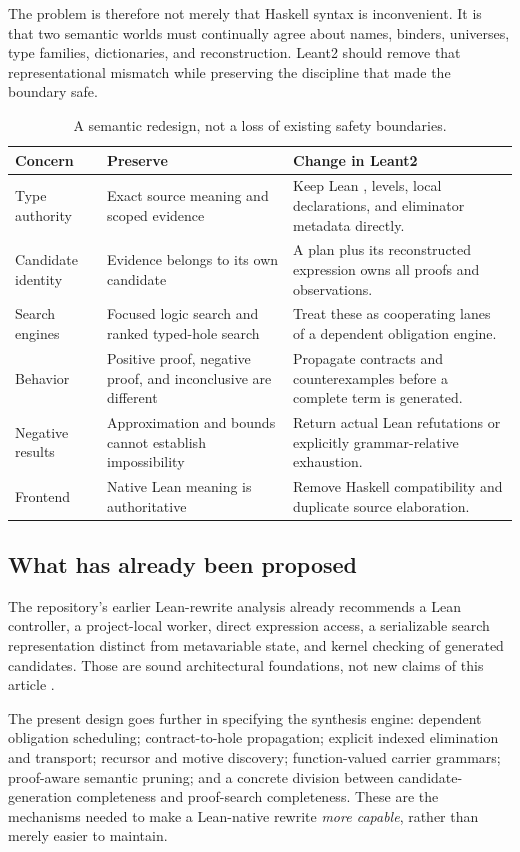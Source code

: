 \documentclass[11pt,letterpaper]{article}
\newcommand{\code}[1]{\texttt{\detokenize{#1}}}
\theoremstyle{definition}
\theoremstyle{remark}
\begin{document}
The problem is therefore not merely that Haskell syntax is inconvenient. It is that two semantic worlds must continually agree about names, binders, universes, type families, dictionaries, and reconstruction. Leant2 should remove that representational mismatch while preserving the discipline that made the boundary safe.

\begin{table}[ht]
\centering\small
\begin{tabularx}{\textwidth}{@{}p{}YY@{}}
\toprule
Concern & Preserve & Change in Leant2\\
\midrule
Type authority & Exact source meaning and scoped evidence & Keep Lean \code{Expr}, levels, local declarations, and eliminator metadata directly.\\
Candidate identity & Evidence belongs to its own candidate & A plan plus its reconstructed expression owns all proofs and observations.\\
Search engines & Focused logic search and ranked typed-hole search & Treat these as cooperating lanes of a dependent obligation engine.\\
Behavior & Positive proof, negative proof, and inconclusive are different & Propagate contracts and counterexamples before a complete term is generated.\\
Negative results & Approximation and bounds cannot establish impossibility & Return actual Lean refutations or explicitly grammar-relative exhaustion.\\
Frontend & Native Lean meaning is authoritative & Remove Haskell compatibility and duplicate source elaboration.\\
\bottomrule
\end{tabularx}
\caption{A semantic redesign, not a loss of existing safety boundaries.}
\end{table}

\subsection{What has already been proposed}

The repository's earlier Lean-rewrite analysis already recommends a Lean controller, a project-local worker, direct expression access, a serializable search representation distinct from metavariable state, and kernel checking of generated candidates. Those are sound architectural foundations, not new claims of this article \cite{rewrite}.

The present design goes further in specifying the synthesis engine: dependent obligation scheduling; contract-to-hole propagation; explicit indexed elimination and transport; recursor and motive discovery; function-valued carrier grammars; proof-aware semantic pruning; and a concrete division between candidate-generation completeness and proof-search completeness. These are the mechanisms needed to make a Lean-native rewrite \emph{more capable}, rather than merely easier to maintain.
\end{document}
